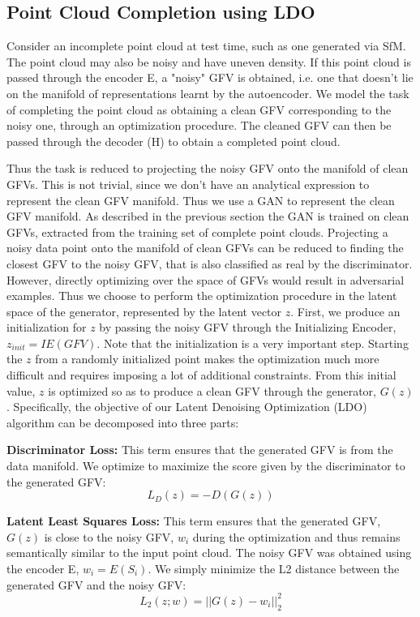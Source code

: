 \documentclass[10pt,twocolumn,letterpaper]{article}
\begin{document}
\subsection{Point Cloud Completion using LDO}
 \label{sec:ldo}
Consider an incomplete point cloud at test time, such as one generated via SfM. The point cloud may also be noisy and have uneven density. If this point cloud is passed through the encoder E, a "noisy" GFV is obtained, i.e. one that doesn't lie on the manifold of representations learnt by the autoencoder. We model the task of completing the point cloud as obtaining a clean GFV corresponding to the noisy one, through an optimization procedure. The cleaned GFV can then be passed through the decoder (H) to obtain a completed point cloud. 

Thus the task is reduced to projecting the noisy GFV onto the manifold of clean GFVs. This is not trivial, since we don't have an analytical expression to represent the clean GFV manifold. Thus we use a GAN to represent the clean GFV manifold. As described in the previous section the GAN is trained on clean GFVs, extracted from the training set of complete point clouds. Projecting a noisy data point onto the manifold of clean GFVs can be reduced to finding the closest GFV to the noisy GFV, that is also classified as real by the discriminator. However, directly optimizing over the space of GFVs would result in adversarial examples. Thus we choose to perform the optimization procedure in the latent space of the generator, represented by the latent vector $z$. First, we produce an initialization for $z$ by passing the noisy GFV through the Initializing Encoder, $z_{init} = IE(GFV)$. Note that the initialization is a very important step. Starting the $z$ from a randomly initialized point makes the optimization much more difficult and requires imposing a lot of additional constraints. From this initial value, $z$ is optimized so as to produce a clean GFV through the generator, $G(z)$. Specifically, the objective of our Latent Denoising Optimization (LDO) algorithm can be decomposed into three parts:

\textbf{Discriminator Loss:} This term ensures that the generated GFV is from the data manifold. We optimize to maximize the score given by the discriminator to the generated GFV:
\begin{equation}
    L_D(z) = - D(G(z))
\end{equation}

\textbf{Latent Least Squares Loss:} This term ensures that the generated GFV, $G(z)$ is close to the noisy GFV, $w_i$ during the optimization and thus remains semantically similar to the input point cloud. The noisy GFV was obtained using the encoder E, $w_i = E(S_i)$. We simply minimize the L2 distance between the generated GFV and the noisy GFV:
\begin{equation}
    L_2(z;w) = ||G(z) - w_i||_2^2
\end{equation}
\end{document}
